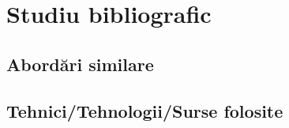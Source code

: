 \chapter{Studiu bibliografic}
\label{cap:studiu-bibliografic}

\section{Abordări similare}

\section{Tehnici/Tehnologii/Surse folosite}